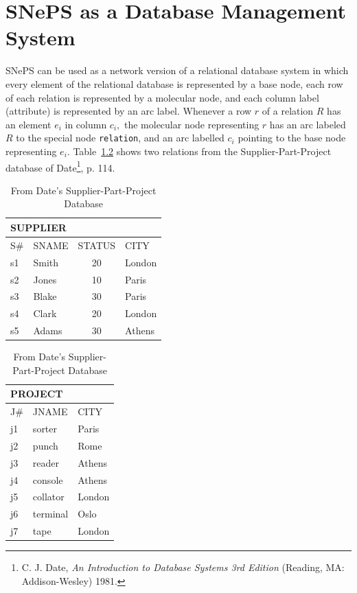 \documentclass{book}
\begin{document}
\chapter{SNePS as a Database Management System}
SNePS can be used as a network version of a relational database system
in which every element of the relational database is represented by a
base node, each row of each relation is represented by a molecular
node, and each column label (attribute) is represented by an arc
label.  Whenever a row $r$ of a relation $R$ has an element $e_i$ in
column $c_i,$ the molecular node representing $r$ has an arc labeled
$R$ to the special node {\tt relation}, and an arc labelled $c_i$
pointing to the base node representing $e_i.$ Table~\ref{dbtable}
shows two relations from the Supplier-Part-Project database of
Date\footnote{C. J. Date, {\em An Introduction to Database Systems 3rd
Edition} (Reading, MA: Addison-Wesley) 1981.}, p. 114.
\begin{table}[htb]
\caption{From Date's Supplier-Part-Project Database}\label{dbtable}
\begin{center}
\begin{tabular}{|l|l|c|l|}
\multicolumn{4}{l}{\bf SUPPLIER}\\\hline
S\# & SNAME & STATUS & CITY \\\hline
s1 & Smith & 20 & London\\
s2 & Jones & 10 & Paris\\
s3 & Blake & 30 & Paris\\
s4 & Clark & 20 & London\\
s5 & Adams & 30 & Athens\\\hline
\end{tabular} \hspace{0.5in}
\begin{tabular}{|l|l|l|}
\multicolumn{3}{l}{\bf PROJECT}\\\hline
J\# & JNAME & CITY\\\hline
j1 & sorter & Paris\\
j2 & punch & Rome\\
j3 & reader & Athens\\
j4 & console & Athens\\
j5 & collator & London\\
j6 & terminal & Oslo\\
j7 & tape & London\\\hline
\end{tabular}
\end{center}
\end{table}
\end{document}
